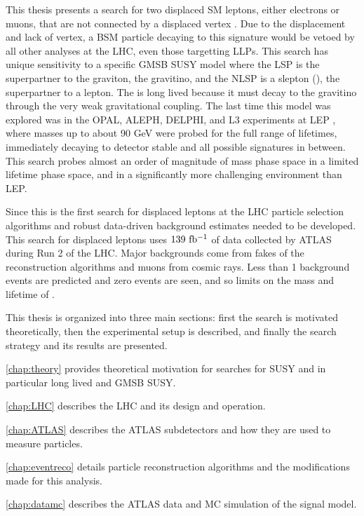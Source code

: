 This thesis presents a search for two displaced \ac{SM} leptons, either electrons or muons, that are not connected by a displaced vertex \cite{conf}. Due to the displacement and lack of vertex, a \ac{BSM} particle decaying to this signature would be vetoed by all other analyses at the \ac{LHC}, even those targetting \acp{LLP}. This search has unique sensitivity to a specific \acf{GMSB} \acf{SUSY} model where the \acf{LSP} is the superpartner to the graviton, the gravitino, and the \acf{NLSP} is a slepton (\slep), the superpartner to a lepton. The \slep is long lived because it must decay to the gravitino through the very weak gravitational coupling. The last time this model was explored was in the OPAL, ALEPH, DELPHI, and L3 experiments at \acf{LEP} \cite{opal}, where masses up to about 90 GeV were probed for the full range of lifetimes, immediately decaying to detector stable and all possible signatures in between. This search probes almost an order of magnitude of mass phase space in a limited lifetime phase space, and in a significantly more challenging environment than \ac{LEP}.

Since this is the first search for displaced leptons at the \ac{LHC} particle selection algorithms and robust data-driven background estimates needed to be developed. This search for displaced leptons uses $139~ \mbox{fb\(^{-1}\)}$ of data collected by \ac{ATLAS} during Run 2 of the \ac{LHC}. Major backgrounds come from fakes of the reconstruction algorithms and muons from cosmic rays. Less than 1 background events are predicted and zero events are seen, and so limits on the mass and lifetime of \slep. 

This thesis is organized into three main sections: first the search is motivated theoretically, then the experimental setup is described, and finally the search strategy and its results are presented.

\autoref{chap:theory} provides theoretical motivation for searches for \ac{SUSY} and in particular long lived and \ac{GMSB} \ac{SUSY}.

\autoref{chap:LHC} describes the \ac{LHC} and its design and operation.

\autoref{chap:ATLAS} describes the \ac{ATLAS} subdetectors and how they are used to measure particles.

\autoref{chap:eventreco} details particle reconstruction algorithms and the modifications made for this analysis.

\autoref{chap:datamc} describes the \ac{ATLAS} data and \acf{MC} simulation of the signal model.

